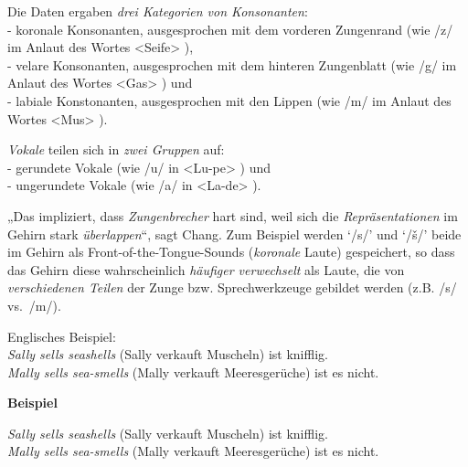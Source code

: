 \documentclass[
  letterpaper,
]{scrbook}
\begin{document}
\begin{tcolorbox}[enhanced jigsaw, coltitle=black, left=2mm, breakable, arc=.35mm, toprule=.15mm, colback=white, opacityback=0, bottomrule=.15mm, leftrule=.75mm, titlerule=0mm, bottomtitle=1mm, toptitle=1mm, title=\textcolor{quarto-callout-important-color}{\faExclamation}\hspace{0.5em}{Important}, colbacktitle=quarto-callout-important-color!10!white, rightrule=.15mm, opacitybacktitle=0.6, colframe=quarto-callout-important-color-frame]

Die Daten ergaben \emph{drei Kategorien von Konsonanten}:\\
- koronale Konsonanten, ausgesprochen mit dem vorderen Zungenrand (wie
/z/ im Anlaut des Wortes \textless Seife\textgreater{} ),\\
- velare Konsonanten, ausgesprochen mit dem hinteren Zungenblatt (wie
/g/ im Anlaut des Wortes \textless Gas\textgreater{} ) und\\
- labiale Konstonanten, ausgesprochen mit den Lippen (wie /m/ im Anlaut
des Wortes \textless Mus\textgreater{} ).

\emph{Vokale} teilen sich in \emph{zwei Gruppen} auf:\\
- gerundete Vokale (wie /u/ in \textless Lu-pe\textgreater{} ) und\\
- ungerundete Vokale (wie /a/ in \textless La-de\textgreater{} ).

\end{tcolorbox}

„Das impliziert, dass \emph{Zungenbrecher} hart sind, weil sich die
\emph{Repräsentationen} im Gehirn stark \emph{überlappen}``, sagt Chang.
Zum Beispiel werden `/s/' und `/š/' beide im Gehirn als
Front-of-the-Tongue-Sounds (\emph{koronale} Laute) gespeichert, so dass
das Gehirn diese wahrscheinlich \emph{häufiger verwechselt} als Laute,
die von \emph{verschiedenen Teilen} der Zunge bzw. Sprechwerkzeuge
gebildet werden (z.B. /s/ vs.~/m/).

Englisches Beispiel:\\
\emph{Sally sells seashells} (Sally verkauft Muscheln) ist knifflig.\\
\emph{Mally sells sea-smells} (Mally verkauft Meeresgerüche) ist es
nicht.

\begin{tcolorbox}[enhanced jigsaw, opacityback=0, left=2mm, bottomrule=.15mm, breakable, arc=.35mm, leftrule=.75mm, rightrule=.15mm, toprule=.15mm, colback=white, colframe=quarto-callout-note-color-frame]
\begin{minipage}[t]{5.5mm}
\textcolor{quarto-callout-note-color}{\faInfo}
\end{minipage}%
\begin{minipage}[t]{\textwidth - 5.5mm}

\textbf{Beispiel}\vspace{2mm}

\emph{Sally sells seashells} (Sally verkauft Muscheln) ist knifflig.\\
\emph{Mally sells sea-smells} (Mally verkauft Meeresgerüche) ist es
nicht.

\end{minipage}%
\end{tcolorbox}
\end{document}
